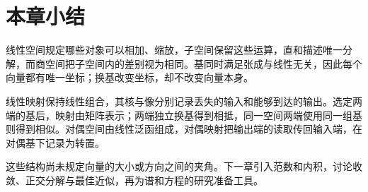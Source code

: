 \section{本章小结}
\label{sec:ls-representation-summary}

线性空间规定哪些对象可以相加、缩放，子空间保留这些运算，直和描述唯一分解，而商空间把子空间内的差别视为相同。基同时满足张成与线性无关，因此每个向量都有唯一坐标；换基改变坐标，却不改变向量本身。

线性映射保持线性组合，其核与像分别记录丢失的输入和能够到达的输出。选定两端的基后，映射由矩阵表示；两端独立换基得到相抵，同一空间两端使用同一组基则得到相似。对偶空间由线性泛函组成，对偶映射把输出端的读取传回输入端，在对偶基下记录为转置。

这些结构尚未规定向量的大小或方向之间的夹角。下一章引入范数和内积，讨论收敛、正交分解与最佳近似，再为谱和方程的研究准备工具。
